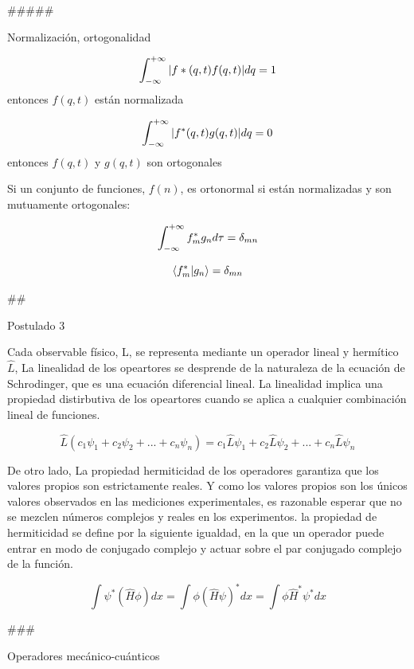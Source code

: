 \documentclass[11pt]{article}
\begin{document}
    \#\#\#\#\#

Normalización, ortogonalidad

     \[\large \int^{+\infty}_{-\infty} |f*(q,t)f(q,t)|dq=1\] entonces
\(f(q,t)\) están normalizada

     \[\large \int^{+\infty}_{-\infty} |f^*(q,t)g(q,t)|dq=0\] entonces
\(f(q,t)\) y \(g(q,t)\) son ortogonales

    Si un conjunto de funciones, \(f(n)\), es ortonormal si están
normalizadas y son mutuamente ortogonales:

     \[\large \int^{+\infty}_{-\infty} f^*_{m}g_{n}d\tau=\delta_{mn}\]

     \[\large \left<f^*_{m}|g_{n}\right>=\delta_{mn}\]

    \#\#

Postulado 3

    Cada observable físico, L, se representa mediante un operador lineal y
hermítico \(\hat L\), La linealidad de los opeartores se desprende de la
naturaleza de la ecuación de Schrodinger, que es una ecuación
diferencial lineal. La linealidad implica una propiedad distirbutiva de
los opeartores cuando se aplica a cualquier combinación lineal de
funciones.

\[\hat{L} (c_1\psi_1+c_2\psi_2+...+c_n\psi_n)=c_1\hat{L} \psi_1+c_2\hat{L}\psi_2+...+c_n\hat{L}\psi_n \]

De otro lado, La propiedad hermiticidad de los operadores garantiza que
los valores propios son estrictamente reales. Y como los valores propios
son los únicos valores observados en las mediciones experimentales, es
razonable esperar que no se mezclen números complejos y reales en los
experimentos. la propiedad de hermiticidad se define por la siguiente
igualdad, en la que un operador puede entrar en modo de conjugado
complejo y actuar sobre el par conjugado complejo de la función.

\[\int \psi^* (\hat{H} \phi) dx = \int \phi (\hat{H} \psi)^* dx =\int \phi \hat{H}^* \psi^* dx \]

    \#\#\#

Operadores mecánico-cuánticos
\end{document}

